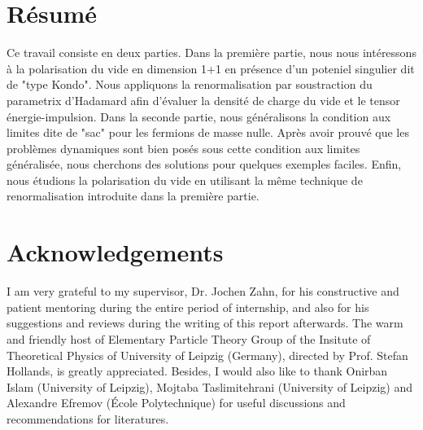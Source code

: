 \section*{Résumé}
Ce travail consiste en deux parties. 
Dans la première partie, nous nous intéressons à la polarisation du vide en dimension 1+1 en présence d'un poteniel singulier dit de "type Kondo".
Nous appliquons la renormalisation par soustraction du parametrix d'Hadamard afin d'évaluer la densité de charge du vide et le tensor énergie-impulsion.
Dans la seconde partie, nous généralisons la condition aux limites dite de "sac" pour les fermions de masse nulle.
Après avoir prouvé que les problèmes dynamiques sont bien posés sous cette condition aux limites généralisée, nous cherchons des solutions pour quelques exemples faciles.
Enfin, nous étudions la polarisation du vide en utilisant la même technique de renormalisation introduite dans la première partie.

\newpage
\section*{Acknowledgements}
I am very grateful to my supervisor, Dr. Jochen Zahn, for his constructive and patient mentoring during the entire period of internship, and also for his suggestions and reviews during the writing of this report afterwards.
The warm and friendly host of Elementary Particle Theory Group of the Insitute of Theoretical Physics of University of Leipzig (Germany), directed by Prof. Stefan Hollands, is greatly appreciated.
Besides, I would also like to thank Onirban Islam (University of Leipzig), Mojtaba Taslimitehrani (University of Leipzig) and Alexandre Efremov (École Polytechnique) for useful discussions and recommendations for literatures. 